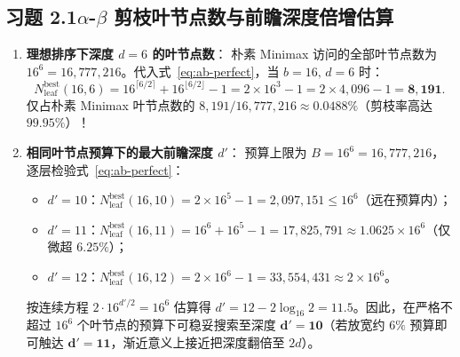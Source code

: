 \subsection*{习题 2.1\quad $\alpha$-$\beta$ 剪枝叶节点数与前瞻深度倍增估算}
\begin{enumerate}[label=(\arabic*), leftmargin=1.8em]
  \item \textbf{理想排序下深度 $d=6$ 的叶节点数}：
  朴素 Minimax 访问的全部叶节点数为 $16^6 = 16{,}777{,}216$。代入式~\eqref{eq:ab-perfect}，当 $b=16,\, d=6$ 时：
  \[
    N_{\text{leaf}}^{\text{best}}(16, 6) = 16^{\lceil 6/2 \rceil} + 16^{\lfloor 6/2 \rfloor} - 1 = 2 \times 16^3 - 1 = 2 \times 4{,}096 - 1 = \mathbf{8{,}191}.
  \]
  仅占朴素 Minimax 叶节点数的 $8{,}191 / 16{,}777{,}216 \approx 0.0488\%$（剪枝率高达 $99.95\%$）！
  \item \textbf{相同叶节点预算下的最大前瞻深度 $d'$}：
  预算上限为 $B = 16^6 = 16{,}777{,}216$，逐层检验式~\eqref{eq:ab-perfect}：
  \begin{itemize}
    \item $d' = 10$：$N_{\text{leaf}}^{\text{best}}(16, 10) = 2 \times 16^5 - 1 = 2{,}097{,}151 \le 16^6$（远在预算内）；
    \item $d' = 11$：$N_{\text{leaf}}^{\text{best}}(16, 11) = 16^6 + 16^5 - 1 = 17{,}825{,}791 \approx 1.0625 \times 16^6$（仅微超 $6.25\%$）；
    \item $d' = 12$：$N_{\text{leaf}}^{\text{best}}(16, 12) = 2 \times 16^6 - 1 = 33{,}554{,}431 \approx 2 \times 16^6$。
  \end{itemize}
  按连续方程 $2 \cdot 16^{d'/2} = 16^6$ 估算得 $d' = 12 - 2\log_{16} 2 = 11.5$。因此，在严格不超过 $16^6$ 个叶节点的预算下可稳妥搜索至深度 $\mathbf{d' = 10}$（若放宽约 $6\%$ 预算即可触达 $\mathbf{d' = 11}$，渐近意义上接近把深度翻倍至 $2d$）。
\end{enumerate}

